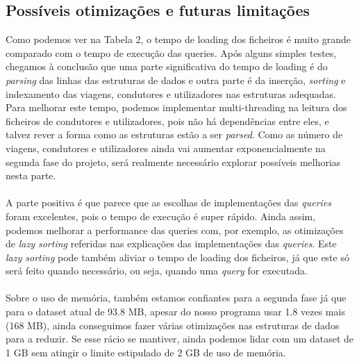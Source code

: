 \documentclass{article}
\begin{document}
        \subsection{Possíveis otimizações e futuras limitações}
        Como podemos ver na Tabela 2, o tempo de loading dos ficheiros é muito
        grande comparado com o tempo de execução das queries.
        Após alguns simples testes, chegamos à conclusão que uma parte 
        significativa do tempo de loading é do \emph{parsing} das linhas
        das estruturas de dados e outra parte é da inserção, \emph{sorting} 
        e indexamento das viagens, condutores e utilizadores nas estruturas
        adequadas. Para melhorar este tempo, podemos implementar multi-threading
        na leitura dos ficheiros de condutores e utilizadores, pois não há
        dependências entre eles, e talvez rever a forma como as estruturas
        estão a ser \emph{parsed}. Como as número de viagens, condutores e
        utilizadores ainda vai aumentar exponencialmente na segunda fase
        do projeto, será realmente necessário explorar possíveis melhorias
        nesta parte.
        \\
        \\A parte positiva é que parece que as escolhas de implementações
        das \emph{queries} foram excelentes, pois o tempo de execução é
        super rápido. Ainda assim, podemos melhorar a performance das queries
        com, por exemplo, as otimizações de \emph{lazy sorting} referidas nas explicações
        das implementações das \emph{queries}. Este \emph{lazy sorting} pode
        também aliviar o tempo de loading dos ficheiros, já que este só será
        feito quando necessário, ou seja, quando uma \emph{query} for executada. 
        \\
        \\Sobre o uso de memória, também estamos confiantes para a segunda fase
        já que para o dataset atual de 93.8 MB, apesar do nosso programa usar
        1.8 vezes mais (168 MB), ainda conseguimos fazer várias otimizações nas 
        estruturas de dados para a reduzir. Se esse rácio se mantiver, ainda podemos
        lidar com um dataset de 1 GB sem atingir o limite estipulado de 2 GB de 
        uso de memória.
        
\end{document}
